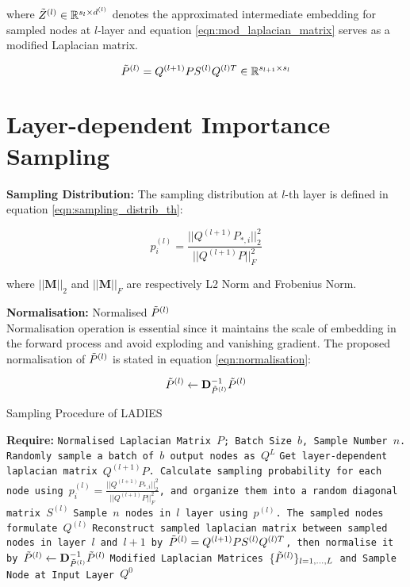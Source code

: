 where $\Tilde{Z}^{(l)} \in \mathbb{R}^{s_l \times d^{(l)}}$ denotes the approximated intermediate embedding for sampled nodes at $l$-layer and equation \ref{eqn:mod_laplacian_matrix} serves as a modified Laplacian matrix.

\begin{equation}
    \Tilde{P}^{(l)} = Q^{(l+1)}PS^{(l)}Q^{(l)T} \in \mathbb{R}^{s_{l+1} \times s_l}
    \label{eqn:mod_laplacian_matrix}
\end{equation}

\section{Layer-dependent Importance Sampling}

\textbf{Sampling Distribution:} The sampling distribution at $l$-th layer is defined in equation \ref{eqn:sampling_distrib_th}:

\begin{equation}
    p_i^{(l)} = \frac{||Q^{(l+1)}P_{*, i}||_2^2}{||Q^{(l+1)}P||_F^2}
    \label{eqn:sampling_distrib_th}
\end{equation}

where $||\mathbf{M}||_2$ and $||\mathbf{M}||_F$ are respectively L2 Norm and Frobenius Norm.

\textbf{Normalisation:} Normalised $\Tilde{P}^{(l)}$\\
Normalisation operation is essential since it  maintains the scale of embedding in the forward process and avoid exploding and vanishing gradient. The proposed normalisation of $\Tilde{P}^{(l)}$ is stated in equation \ref{eqn:normalisation}:

\begin{equation}
    \Tilde{P}^{(l)} \xleftarrow{} \mathbf{D}_{\Tilde{P}^{(l)}}^{-1} \Tilde{P}^{(l)}
    \label{eqn:normalisation}
\end{equation}

\begin{algorithm}[H]
	\caption{Sampling Procedure of LADIES}
	\begin{algorithmic}[1]
        \State \textbf{Require:} \texttt{Normalised Laplacian Matrix $P$; Batch Size $b$, Sample Number $n$. Randomly sample a batch of $b$ output nodes  as $Q^L$}
            \State \texttt{Get layer-dependent laplacian matrix $Q^{(l+1)}P$. Calculate sampling probability for each node using $p_i^{(l)} = \frac{||Q^{(l+1)}P_{*, i}||_2^2}{||Q^{(l+1)}P||_F^2}$, and organize them into a random diagonal matrix $S^{(l)}$}
            \State \texttt{Sample $n$ nodes in $l$ layer using $p^{(l)}$. The sampled nodes formulate $Q^{(l)}$}
            \State \texttt{Reconstruct sampled laplacian matrix between sampled nodes in layer $l$ and $l+1$ by $\Tilde{P}^{(l)} = Q^{(l+1)}PS^{(l)}Q^{(l)T}$, then normalise it by $\Tilde{P}^{(l)} \xleftarrow{} \mathbf{D}_{\Tilde{P}^{(l)}}^{-1} \Tilde{P}^{(l)}$}
        \EndFor
        \State \Return \texttt{Modified Laplacian Matrices $\{\Tilde{P}^{(l)}\}_{l= 1, ..., L}$ and Sample Node at Input Layer $Q^0$}
    \end{algorithmic}
\end{algorithm}


